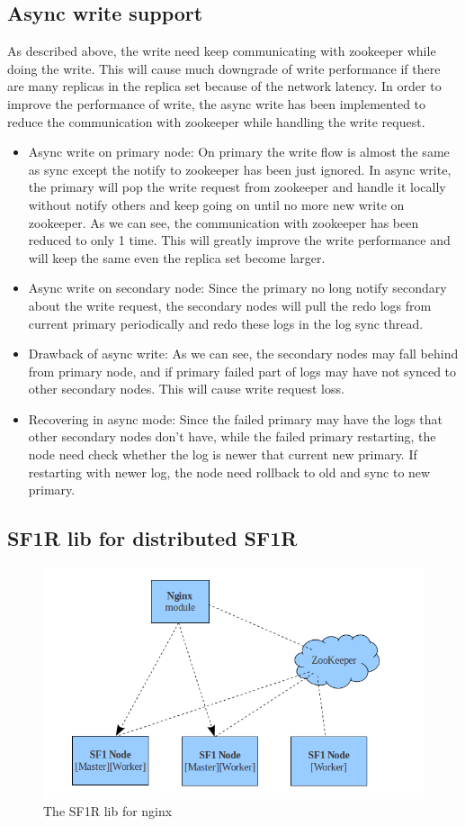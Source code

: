 \subsection{Async write support}
As described above, the write need keep communicating with zookeeper while doing the write. This will cause much downgrade of write performance if there are many replicas in the replica set because of the network latency. In order to improve the  performance of write, the async write has been implemented to reduce the communication with zookeeper while handling the write request. 
\begin{itemize}
\item Async write on primary node: On primary the write flow is almost the same as sync except the notify to zookeeper has been just ignored. In async write, the primary will pop the write request from zookeeper and handle it locally without notify others and keep going on until no more new write on zookeeper. As we can see, the communication with zookeeper has been reduced to only 1 time. This will greatly improve the write performance and will keep the same even the replica set become larger.
\item Async write on secondary node: Since the primary no long notify secondary about the write request, the secondary nodes will pull the redo logs from current primary periodically and redo these logs in the log sync thread. 
\item Drawback of async write: As we can see, the secondary nodes may fall behind from primary node, and if primary failed part of logs may have not synced to other secondary nodes. This will cause write request loss.
\item Recovering in async mode: Since the failed primary may have the logs that other secondary nodes don't have, while the failed primary restarting, the node need check whether the log is newer that current new primary. If restarting with newer log, the node need rollback to old and sync to new primary.

\end{itemize}

\subsection{SF1R lib for distributed SF1R}

\begin{figure}[!ht]\centering
  \includegraphics[width=.60\textwidth]{Figures/nginx-sf1rlib.png}
  \caption{The SF1R lib for nginx}\label{fig:sf1rlib}
\end{figure}

